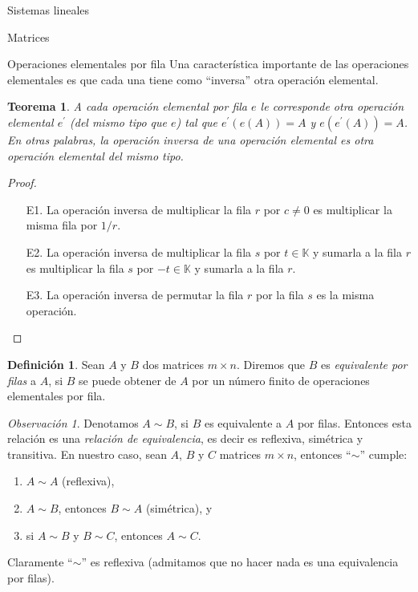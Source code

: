 \documentclass[a4paper,12pt,twoside,spanish,reqno]{amsbook}
\newtheorem{teorema}{Teorema}[section]
\theoremstyle{definition}
\newtheorem{definicion}{Definici\'on}[section]
\theoremstyle{remark}
\newtheorem{obs}{Observaci\'on}[section]
\newcommand{\K}{\mathbb K}
\begin{document}
\begin{chapter}{Sistemas lineales}
\begin{section}{Matrices}
\begin{subsection}{Operaciones elementales por fila}
                Una característica importante de las operaciones elementales es que cada una tiene como ``inversa'' otra operación elemental. 
                
                \begin{teorema}\label{op-elem}
                    A cada operación elemental por fila $e$ le corresponde otra operación elemental $e^\prime$ (del mismo tipo que $e$) tal que $e^\prime(e(A)) = A$ y $e(e^\prime(A)) = A$. En otras palabras, la operación inversa de una operación elemental es otra operación elemental del mismo tipo.  
                \end{teorema}
                \begin{proof} \
                    \begin{enumerate}
                        \item[E1.] La operación inversa de multiplicar la fila $r$ por $c\not=0$ es multiplicar la misma fila por $1/r$.
                        \item[E2.] La operación inversa de multiplicar la fila $s$ por  $t \in \K$ y sumarla a la fila $r$ es multiplicar  la fila $s$ por  $-t \in \K$ y sumarla a la fila $r$.
                        \item[E3.] La operación inversa de permutar la fila $r$ por la fila $s$ es la misma operación.
                    \end{enumerate}
                \end{proof}
                
                \begin{definicion} 
                    Sean $A$ y $B$ dos matrices $m \times n$. Diremos que $B$ es \textit{equivalente por filas} a $A$, si $B$ se puede obtener de $A$ por un número finito de operaciones elementales por fila. 
                \end{definicion}
            

                \begin{obs} Denotamos $A \sim B$, si $B$ es equivalente a $A$ por filas. Entonces esta relación es una \textit{relación de equivalencia}, es decir es reflexiva, simétrica y transitiva. En  nuestro caso, sean $A$, $B$ y $C$ matrices $m \times n$, entonces ``$\sim$'' cumple: 
                    \begin{enumerate}
                        \item  $A \sim A$ (reflexiva), 
                        \item $A \sim B$, entonces $B \sim A$ (simétrica), y
                        \item si $A \sim B$ y $B \sim C$, entonces $A \sim C$.   
                    \end{enumerate}
                    Claramente ``$\sim$'' es reflexiva (admitamos que no hacer nada es una equivalencia por filas). 
                    

\end{obs}
\end{subsection}
\end{section}
\end{chapter}
\end{document}
